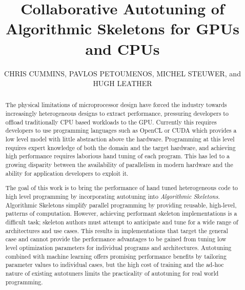 




  \title{Collaborative Autotuning of Algorithmic Skeletons for GPUs and CPUs}

  \author{CHRIS CUMMINS, PAVLOS PETOUMENOS, MICHEL STEUWER, and HUGH LEATHER
  }

  \begin{abstract}
    The physical limitations of microprocessor design have forced the industry towards increasingly heterogeneous designs to extract performance, pressuring developers to offload traditionally CPU based workloads to the GPU. Currently this requires developers to use programming languages such as OpenCL or CUDA which provides a low level model with little abstraction above the hardware. Programming at this level requires expert knowledge of both the domain and the target hardware, and achieving high performance requires laborious hand tuning of each program. This has led to a growing disparity between the availability of parallelism in modern hardware and the ability for application developers to exploit it.

    The goal of this work is to bring the performance of hand tuned heterogeneous code to high level programming by incorporating autotuning into \textit{Algorithmic Skeletons}. Algorithmic Skeletons simplify parallel programming by providing reusable, high-level, patterns of computation. However, achieving performant skeleton implementations is a difficult task; skeleton authors must attempt to anticipate and tune for a wide range of architectures and use cases. This results in implementations that target the general case and cannot provide the performance advantages to be gained from tuning low level optimization parameters for individual programs and architectures. Autotuning combined with machine learning offers promising performance benefits by tailoring parameter values to individual cases, but the high cost of training and the ad-hoc nature of existing autotuners limits the practicality of autotuning for real world programming.


\end{abstract}
